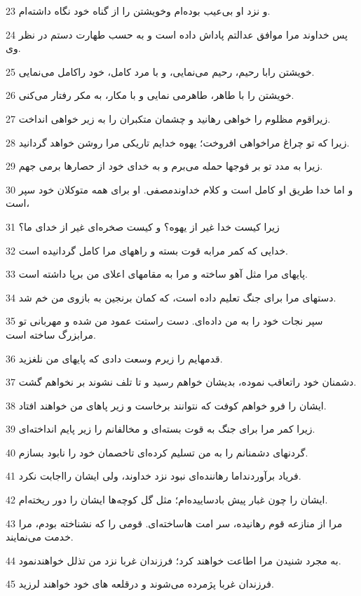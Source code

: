 \par 23 و نزد او بی‌عیب بوده‌ام وخویشتن را از گناه خود نگاه داشته‌ام.
\par 24 پس خداوند مرا موافق عدالتم پاداش داده است و به حسب طهارت دستم در نظر وی.
\par 25 خویشتن رابا رحیم، رحیم می‌نمایی، و با مرد کامل، خود راکامل می‌نمایی.
\par 26 خویشتن را با طاهر، طاهرمی نمایی و با مکار، به مکر رفتار می‌کنی.
\par 27 زیراقوم مظلوم را خواهی رهانید و چشمان متکبران را به زیر خواهی انداخت.
\par 28 زیرا که تو چراغ مراخواهی افروخت؛ یهوه خدایم تاریکی مرا روشن خواهد گردانید.
\par 29 زیرا به مدد تو بر فوجها حمله می‌برم و به خدای خود از حصارها برمی جهم.
\par 30 و اما خدا طریق او کامل است و کلام خداوندمصفی. او برای همه متوکلان خود سپر است،
\par 31 زیرا کیست خدا غیر از یهوه؟ و کیست صخره‌ای غیر از خدای ما؟
\par 32 خدایی که کمر مرابه قوت بسته و راههای مرا کامل گردانیده است. 
\par 33 پایهای مرا مثل آهو ساخته و مرا به مقامهای اعلای من برپا داشته است.
\par 34 دستهای مرا برای جنگ تعلیم داده است، که کمان برنجین به بازوی من خم شد.
\par 35 سپر نجات خود را به من داده‌ای. دست راستت عمود من شده و مهربانی تو مرابزرگ ساخته است.
\par 36 قدمهایم را زیرم وسعت دادی که پایهای من نلغزید.
\par 37 دشمنان خود راتعاقب نموده، بدیشان خواهم رسید و تا تلف نشوند بر نخواهم گشت.
\par 38 ایشان را فرو خواهم کوفت که نتوانند برخاست و زیر پاهای من خواهند افتاد.
\par 39 زیرا کمر مرا برای جنگ به قوت بسته‌ای و مخالفانم را زیر پایم انداخته‌ای.
\par 40 گردنهای دشمنانم را به من تسلیم کرده‌ای تاخصمان خود را نابود بسازم.
\par 41 فریاد برآوردنداما رهاننده‌ای نبود نزد خداوند، ولی ایشان رااجابت نکرد.
\par 42 ایشان را چون غبار پیش بادساییده‌ام؛ مثل گل کوچه‌ها ایشان را دور ریخته‌ام.
\par 43 مرا از منازعه قوم رهانیده، سر امت هاساخته‌ای. قومی را که نشناخته بودم، مرا خدمت می‌نمایند.
\par 44 به مجرد شنیدن مرا اطاعت خواهند کرد؛ فرزندان غربا نزد من تذلل خواهندنمود.
\par 45 فرزندان غربا پژمرده می‌شوند و درقلعه های خود خواهند لرزید.
